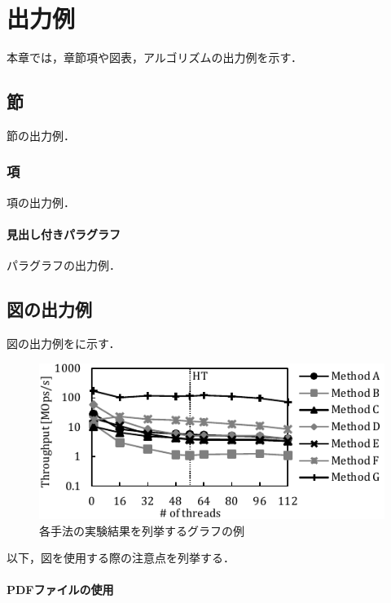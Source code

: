
\section{出力例}

本章では，章節項や図表，アルゴリズムの出力例を示す．



\subsection{節}

節の出力例．


\subsubsection{項}

項の出力例．

\paragraph{見出し付きパラグラフ}

パラグラフの出力例．



\subsection{図の出力例}

図の出力例を\Fig{\ref{fig:sample_independent}}に示す．

\begin{figure}[t]
  \centering
  \includegraphics{./figures/graph-independent_methods.pdf}
  \caption{各手法の実験結果を列挙するグラフの例}
  \label{fig:sample_independent}
\end{figure}

以下，図を使用する際の注意点を列挙する．

\paragraph{PDFファイルの使用}

